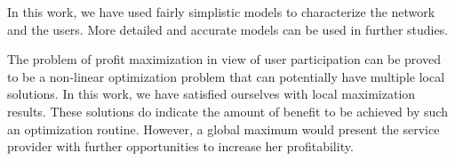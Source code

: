 \documentclass[conference,a4paper]{IEEEtran}
\begin{document}
In this work, we have used fairly simplistic models to characterize the network and the users. More detailed and accurate models can be used in further studies. 

The problem of profit maximization in view of user participation can be proved to be a non-linear optimization problem that can potentially have multiple local solutions. In this work, we have satisfied ourselves with local maximization results. These solutions do indicate the amount of benefit to be achieved by such an optimization routine. However, a global maximum would present the service provider with further opportunities to increase her profitability.



\end{document}
